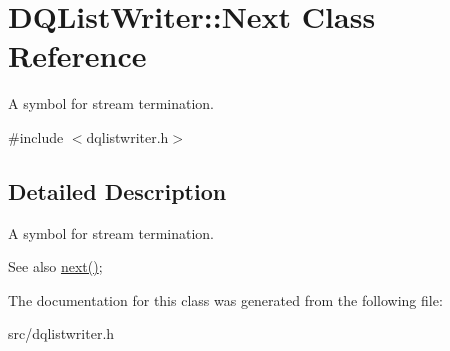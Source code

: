 \hypertarget{classDQListWriter_1_1Next}{
\section{DQListWriter::Next Class Reference}
\label{classDQListWriter_1_1Next}
}


A symbol for stream termination.  




{\ttfamily \#include $<$dqlistwriter.h$>$}



\subsection{Detailed Description}
A symbol for stream termination. \begin{DoxySeeAlso}{See also}
\hyperlink{classDQListWriter_a5fbce83cb77c2ce6eaea54e39594d244}{next()}; 
\end{DoxySeeAlso}


The documentation for this class was generated from the following file:\begin{DoxyCompactItemize}
\item 
src/dqlistwriter.h\end{DoxyCompactItemize}
